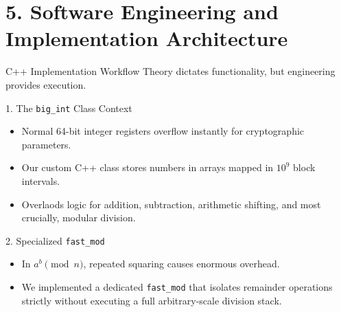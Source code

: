 \documentclass[10pt, compress]{beamer}
\begin{document}
\section{5. Software Engineering and Implementation Architecture}
\begin{frame}{C++ Implementation Workflow}
    Theory dictates functionality, but engineering provides execution.
    
    \pause
    \begin{block}{1. The \texttt{big\_int} Class Context}
        \begin{itemize}
            \item Normal 64-bit integer registers overflow instantly for cryptographic parameters.
            \item Our custom C++ class stores numbers in arrays mapped in $10^9$ block intervals.
            \item Overlaods logic for addition, subtraction, arithmetic shifting, and most crucially, modular division.
        \end{itemize}
    \end{block}
    
    \pause
    \begin{block}{2. Specialized \texttt{fast\_mod}}
        \begin{itemize}
            \item In $a^b \pmod n$, repeated squaring causes enormous overhead.
            \item We implemented a dedicated \texttt{fast\_mod} that isolates remainder operations strictly without executing a full arbitrary-scale division stack.
        \end{itemize}
    \end{block}
\end{frame}
\end{document}
